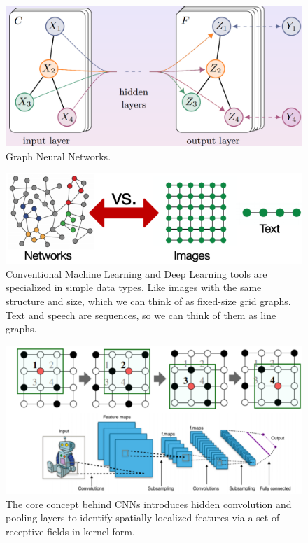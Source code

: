 \begin{figure}[H]
    \centering
    \includegraphics[width=\textwidth]{images/graphNeuralNetworl.png}
    \caption{Graph Neural Networks.}
    \label{fig:graph_neural_networks}
\end{figure}

\begin{figure}[H]
    \centering
    \includegraphics[width=\textwidth]{images/networksVsImages.png}
    \caption{Conventional Machine Learning and Deep Learning tools are specialized in simple data types. Like images with the same structure and size, which we can think of as fixed-size grid graphs. Text and speech are sequences, so we can think of them as line graphs.}
    \label{fig:networksVsImages}
\end{figure}

\begin{figure}[H]
    \centering
    \includegraphics[width=\textwidth]{images/cnnOnAnImage.png}
    \caption{The core concept behind CNNs introduces hidden convolution and pooling layers to identify spatially localized features via a set of receptive fields in kernel form.}
    \label{fig:cnnOnAnImage}
\end{figure}

